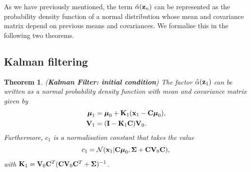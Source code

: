 \documentclass[12pt, oneside]{book}
\numberwithin{equation}{section}
\newcommand{\x}{{\bf x}}
\newcommand{\z}{{\bf z}}
\newcommand{\N}{\mathcal{N}}
\newtheorem{theorem}{Theorem}[section]
\begin{document}
{As we have previously mentioned, the term $\hat\alpha(\z_n)$ can be represented as the probability density function of a normal distribution whose mean and covariance matrix depend on previous means and covariances. We formalise this in the following two theorems.

\subsection{Kalman filtering}
\begin{theorem} (\textbf{Kalman Filter: initial condition}) \label{theorem:kalman-filter-initial}
	The factor $\hat\alpha(\z_1)$ can be written as a normal probability density function with mean and covariance matrix given by
	\begin{align}
		\boldsymbol{\mu}_1 &= \boldsymbol{\mu}_0 + {\bf K}_1(\x_1 -{\bf C}\boldsymbol\mu_0),\\
		{\bf V}_1 &=  ({\bf I} - {\bf K}_1{\bf C}){\bf V}_0.
	\end{align}
	Furthermore, $c_1$ is a normalisation constant that takes the value
	\begin{equation}
		c_1 = \N(\x_1\vert {\bf C}\boldsymbol\mu_0, \boldsymbol\Sigma + {\bf C} {\bf V}_0 {\bf C}),
	\end{equation}
	with ${\bf K}_1 = {\bf V}_0{\bf C}^T({\bf C} {\bf V}_0 {\bf C}^T + \boldsymbol\Sigma)^{-1}$.
\end{theorem}

}
\end{document}
